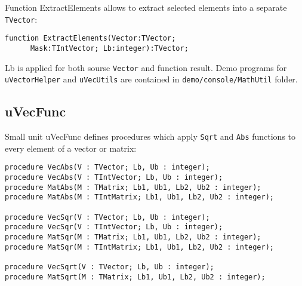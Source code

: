 \documentclass[12pt,a4paper,oneside]{article}
\newcommand{\code}[1]{\texttt{#1}}
\begin{document}
Function ExtractElements allows to extract selected elements into a separate \code{TVector}:
\begin{verbatim}
function ExtractElements(Vector:TVector; 
      Mask:TIntVector; Lb:integer):TVector;
\end{verbatim}
Lb is applied for both sourse \code{Vector} and function result.
Demo programs for \code{uVectorHelper} and \code{uVecUtils}  are contained in \code{demo/console/MathUtil} folder. 
\subsection{uVecFunc}
Small unit uVecFunc defines procedures which apply \code{Sqrt} and \code{Abs} functions to every element of a vector or matrix:
\begin{verbatim}
procedure VecAbs(V : TVector; Lb, Ub : integer);
procedure VecAbs(V : TIntVector; Lb, Ub : integer);
procedure MatAbs(M : TMatrix; Lb1, Ub1, Lb2, Ub2 : integer);
procedure MatAbs(M : TIntMatrix; Lb1, Ub1, Lb2, Ub2 : integer);

procedure VecSqr(V : TVector; Lb, Ub : integer);
procedure VecSqr(V : TIntVector; Lb, Ub : integer);
procedure MatSqr(M : TMatrix; Lb1, Ub1, Lb2, Ub2 : integer);
procedure MatSqr(M : TIntMatrix; Lb1, Ub1, Lb2, Ub2 : integer);

procedure VecSqrt(V : TVector; Lb, Ub : integer);
procedure MatSqrt(M : TMatrix; Lb1, Ub1, Lb2, Ub2 : integer);
\end{verbatim}
\end{document}
